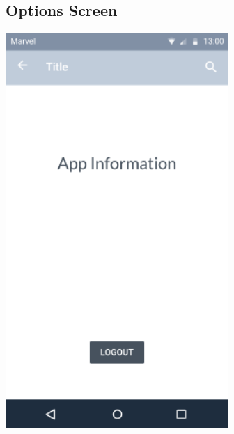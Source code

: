 \documentclass{report}
\begin{document}
\subsection{Options Screen}
\begin{center}
    \includegraphics[scale=0.6]{design-options}
\end{center}

\newpage
\end{document}
